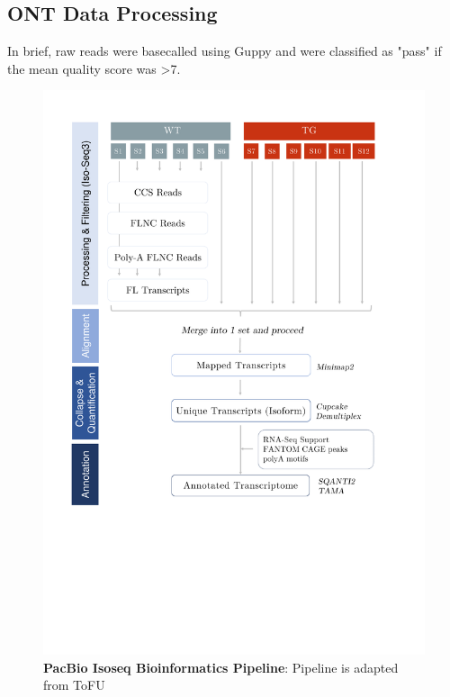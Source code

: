 \subsection{ONT Data Processing}
In brief, raw reads were basecalled using Guppy and were classified as "pass" if the mean quality score was >7. 


\begin{figure}[htp]
	\centering
	\vspace{20pt}
	\includegraphics[page=1,trim={0 12cm 2cm 1cm},clip, scale = 0.45]{Figures/Pipeline.pdf}
	\captionsetup{width=0.95\textwidth}
	\caption[PacBio Isoseq Bioinformatics Pipeline]%
	{\textbf{PacBio Isoseq Bioinformatics Pipeline}: Pipeline is adapted from ToFU  \cite{Gordon2015}}
	\label{fig:isoseq_whole_pipeline}
\end{figure}
 
